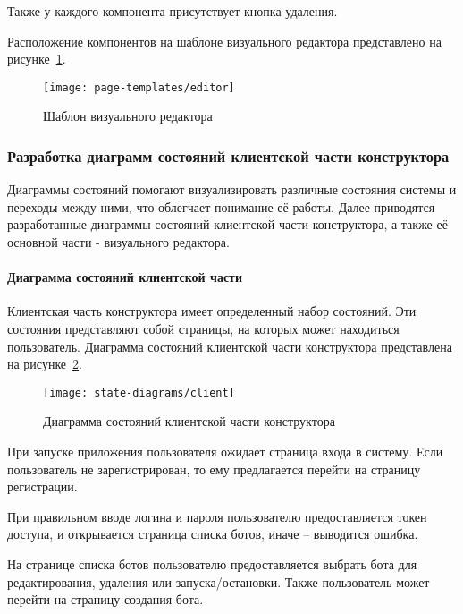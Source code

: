 Также у каждого компонента присутствует кнопка удаления.

Расположение компонентов на шаблоне визуального редактора
представлено на рисунке~\ref{f:editor-template}.

\begin{figure}[!ht]
	\centering
	\vspace{\toppaddingoffigure}
	\texttt{[image: page-templates/editor]}
	\caption{Шаблон визуального редактора}
	\label{f:editor-template}
\end{figure}
\newpage
\subsubsection{Разработка диаграмм состояний клиентской части конструктора}

Диаграммы состояний помогают визуализировать различные состояния системы и переходы между ними, что облегчает понимание её работы.
Далее приводятся разработанные диаграммы состояний клиентской части конструктора, а также
её основной части - визуального редактора.

\paragraph{Диаграмма состояний клиентской части}

Клиентская часть конструктора имеет определенный набор состояний.
Эти состояния представляют собой страницы, на которых может находиться пользователь.
Диаграмма состояний клиентской части конструктора представлена на
рисунке~\ref{f:client-state-diagram}.

\begin{figure}[!ht]
	\centering
	\texttt{[image: state-diagrams/client]}
	\caption{Диаграмма состояний клиентской части конструктора}
	\label{f:client-state-diagram}
\end{figure}

При запуске приложения пользователя ожидает страница входа в
систему. Если пользователь не зарегистрирован, то ему предлагается перейти
на страницу регистрации.

При правильном вводе логина и пароля пользователю предоставляется
токен доступа, и открывается страница списка ботов, иначе – выводится
ошибка.

На странице списка ботов пользователю предоставляется выбрать бота
для редактирования, удаления или запуска/остановки. Также пользователь
может перейти на страницу создания бота.

